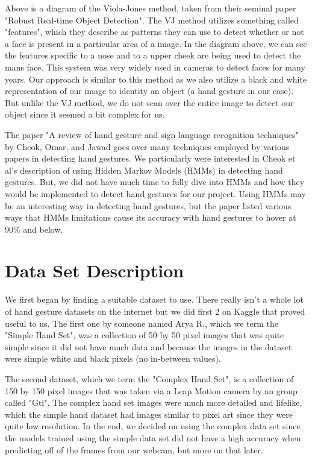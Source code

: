 \documentclass[letterpaper]{article} %
\begin{document}
Above is a diagram of the Viola-Jones method, taken from their seminal paper "Robust Real-time Object Detection". The VJ method utilizes something called "features", which they describe as patterns they can use to detect whether or not a face is present in a particular area of a image. In the diagram above, we can see the features specific to a nose and to a upper cheek are being used to detect the mans face. This system was very widely used in cameras to detect faces for many years. Our approach is similar to this method as we also utilize a black and white representation of our image to identity an object (a hand gesture in our case). But unlike the VJ method, we do not scan over the entire image to detect our object since it seemed a bit complex for us.

The paper "A review of hand gesture and sign language recognition techniques" by Cheok, Omar, and Jawad goes over many techniques employed by various papers in detecting hand gestures. We particularly were interested in Cheok et al's description of using Hidden Markov Models (HMMs) in detecting hand gestures. But, we did not have much time to fully dive into HMMs and how they would be implemented to detect hand gestures for our project. Using HMMs may be an interesting way in detecting hand gestures, but the paper listed various ways that HMMs limitations cause its accuracy with hand gestures to hover at 90\% and below.

\section{Data Set Description}
We first began by finding a suitable dataset to use. There really isn't a whole lot of hand gesture datasets on the internet but we did first 2 on Kaggle that proved useful to us. The first one by someone named Arya R., which we term the "Simple Hand Set", was a collection of 50 by 50 pixel images that was quite simple since it did not have much data and because the images in the dataset were simple white and black pixels (no in-between values). 

The second dataset, which we term the "Complex Hand Set", is a collection of 150 by 150 pixel images that was taken via a Leap Motion camera by an group called "Gti". The complex hand set images were much more detailed and lifelike, which the simple hand dataset had images similar to pixel art since they were quite low resolution. In the end, we decided on using the complex data set since the models trained using the simple data set did not have a high accuracy when predicting off of the frames from our webcam, but more on that later.
\end{document}
